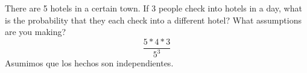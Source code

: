 \item There are 5 hotels in a certain town. If 3 people check into hotels in a day, what is the probability that they each check into a different hotel? What assumptions are you making?
\[ \frac{5*4*3}{5^3} \]
Asumimos que los hechos son independientes.